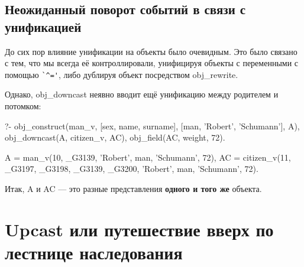 \documentclass[a4paper]{book}
\begin{document}
\begin{comment}
Например, возвращаясь к примеру
Шуман-Мазур, нам бы достаточно было бы написать так:

\begin{example}{}{}
?- obj_construct(man_v, 
      [sex, name, surname], 
      [man, 'Robert', 'Schumann'], A), 

   obj_construct(citizen_v, 
      [sex, name, surname, country], 
      [woman, 'Oksana', 'Mazur', ['Ukraine']], B), 

   obj_downcast(A, citizen_v, AC),

   zagz(AC, B, _, A2, B2), 

   obj_pretty_print(A2), 
   obj_pretty_print(B2).

citizen_v ( 
  sex : man 
  name : Robert 
  surname : Schumann 
  country : [Ukraine] 
) 
citizen_v ( 
  sex : woman 
  name : Oksana 
  surname : Schumann 
  country : [Ukraine] 
) 
\end{example}

чтобы сделать Роберта Шумана гражданином Украины.
\end{comment}

\subsection{Неожиданный поворот событий в связи с унификацией}

До сих пор влияние унификации на объекты было очевидным. Это было
связано с тем, что мы всегда её контроллировали, унифицируя
объекты с переменными с помощью \verb|`^='|, либо дублируя объект
посредством obj_rewrite. 

Однако, obj_downcast неявно вводит ещё унификацию между родителем и потомком:

\begin{example}{}{}
?- obj_construct(man_v, 
      [sex, name, surname], 
      [man, 'Robert', 'Schumann'], A), 
   obj_downcast(A, citizen_v, AC),
   obj_field(AC, weight, 72).

A = man_v(10, _G3139, 'Robert', man, 'Schumann', 72),
AC = citizen_v(11, _G3197, _G3198, _G3139, _G3200, 'Robert', man, 'Schumann', 72).
\end{example}

Итак, A и AC --- это разные представления {\bf одного и того же}
объекта.

\section{Upcast или путешествие вверх по лестнице наследования}
\label{upcast}
\end{document}
